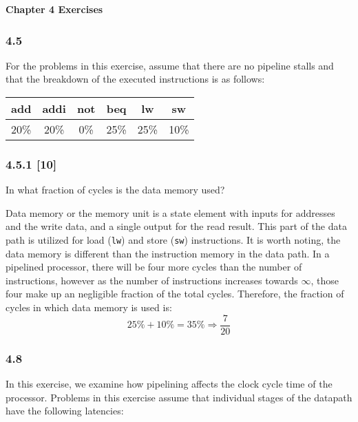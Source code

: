 \documentclass[fleqn]{article}
\begin{document}
\pagestyle{fancy}
\fancyhead{}
\fancyhead[R]{\thepage}
\fancyfoot{}

\begin{center}
    \Large{\textbf{Chapter 4 Exercises}}\\
\end{center}
\vspace{0.25in}

\subsubsection*{4.5} For the problems in this exercise, assume that there are no pipeline stalls and that the breakdown of the
executed instructions is as follows:

\begin{table}[H]
    \centering
    \begin{tabular}{|c|c|c|c|c|c|}
    \hline
    \rowcolor[HTML]{1391DB} 
    add & addi & not & beq & lw & sw \\ \hline \hline
    20\% & 20\% & 0\% & 25\% & 25\% & 10\% \\ \hline
    \end{tabular}
\end{table}


\subsubsection*{4.5.1 [10] \textrangle} In what fraction of cycles is the data memory used?
\vspace{0.125in}
\begin{addmargin}[0.15cm]{0cm}
Data memory or the memory unit is a state element with inputs for addresses and the write data, 
and a single output for the read result. This part of the data path is utilized for load 
(\verb|lw|) and store (\verb|sw|) instructions. It is worth noting, the data memory is 
different than the instruction memory in the data path. In a pipelined processor, there 
will be four more cycles than the number of instructions, however as the number of 
instructions increases towards $\infty$, those four make up an negligible fraction 
of the total cycles. Therefore, the fraction of cycles in which data memory is used is: \[25\% + 10\% = 35\% \Rightarrow \frac{7}{20}\]
\end{addmargin}

\vspace{0.125in}
\subsubsection*{4.8} In this exercise, we examine how pipelining affects the clock cycle time of the processor. Problems in
this exercise assume that individual stages of the datapath have the following latencies:
\end{document}
